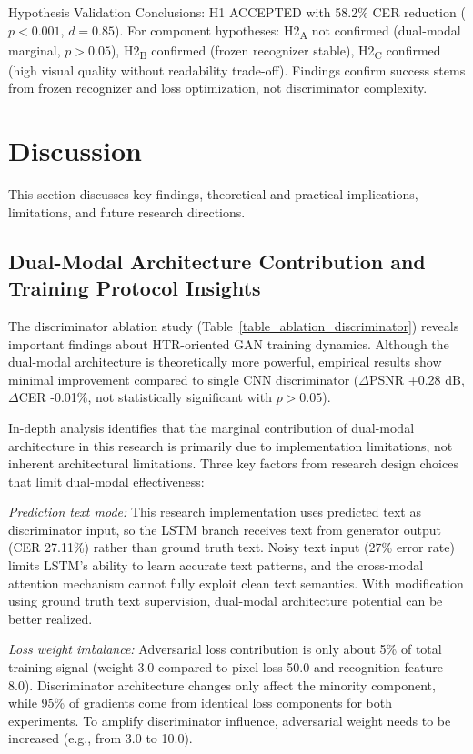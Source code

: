 \documentclass[journal]{IEEEtran}
\begin{document}
Hypothesis Validation Conclusions: H1 ACCEPTED with 58.2\% CER reduction ($p<0.001$, $d=0.85$). For component hypotheses: H2\textsubscript{A} not confirmed (dual-modal marginal, $p>0.05$), H2\textsubscript{B} confirmed (frozen recognizer stable), H2\textsubscript{C} confirmed (high visual quality without readability trade-off). Findings confirm success stems from frozen recognizer and loss optimization, not discriminator complexity.

\section{Discussion}

This section discusses key findings, theoretical and practical implications, limitations, and future research directions.

\subsection{Dual-Modal Architecture Contribution and Training Protocol Insights}

The discriminator ablation study (Table~\ref{table_ablation_discriminator}) reveals important findings about HTR-oriented GAN training dynamics. Although the dual-modal architecture is theoretically more powerful, empirical results show minimal improvement compared to single CNN discriminator ($\Delta$PSNR +0.28 dB, $\Delta$CER -0.01\%, not statistically significant with $p > 0.05$). 

In-depth analysis identifies that the marginal contribution of dual-modal architecture in this research is primarily due to implementation limitations, not inherent architectural limitations. Three key factors from research design choices that limit dual-modal effectiveness:

\textit{Prediction text mode:} This research implementation uses predicted text as discriminator input, so the LSTM branch receives text from generator output (CER 27.11\%) rather than ground truth text. Noisy text input (27\% error rate) limits LSTM's ability to learn accurate text patterns, and the cross-modal attention mechanism cannot fully exploit clean text semantics. With modification using ground truth text supervision, dual-modal architecture potential can be better realized.

\textit{Loss weight imbalance:} Adversarial loss contribution is only about 5\% of total training signal (weight 3.0 compared to pixel loss 50.0 and recognition feature 8.0). Discriminator architecture changes only affect the minority component, while 95\% of gradients come from identical loss components for both experiments. To amplify discriminator influence, adversarial weight needs to be increased (e.g., from 3.0 to 10.0).
\end{document}
